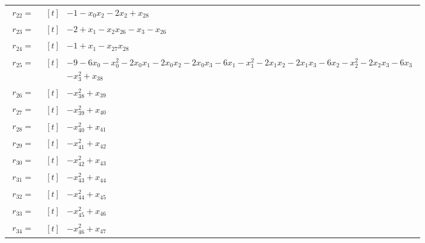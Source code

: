 \begin{longtable}{@{}r p{0.92\linewidth}@{}}
$r_{22}=$ & $\begin{aligned}[t]&-1-x_{0}x_{2}-2x_{2}+x_{28}\end{aligned}$ \\[2pt]
$r_{23}=$ & $\begin{aligned}[t]&-2+x_{1}-x_{2}x_{26}-x_{3}-x_{26}\end{aligned}$ \\[2pt]
$r_{24}=$ & $\begin{aligned}[t]&-1+x_{1}-x_{27}x_{28}\end{aligned}$ \\[2pt]
$r_{25}=$ & $\begin{aligned}[t]&-9-6x_{0}-x_{0}^{2}-2x_{0}x_{1}-2x_{0}x_{2}-2x_{0}x_{3}-6x_{1}-x_{1}^{2}-2x_{1}x_{2}-2x_{1}x_{3}-6x_{2}-x_{2}^{2}-2x_{2}x_{3}-6x_{3}\\[-1pt] &-x_{3}^{2}+x_{38}\end{aligned}$ \\[2pt]
$r_{26}=$ & $\begin{aligned}[t]&-x_{38}^{2}+x_{39}\end{aligned}$ \\[2pt]
$r_{27}=$ & $\begin{aligned}[t]&-x_{39}^{2}+x_{40}\end{aligned}$ \\[2pt]
$r_{28}=$ & $\begin{aligned}[t]&-x_{40}^{2}+x_{41}\end{aligned}$ \\[2pt]
$r_{29}=$ & $\begin{aligned}[t]&-x_{41}^{2}+x_{42}\end{aligned}$ \\[2pt]
$r_{30}=$ & $\begin{aligned}[t]&-x_{42}^{2}+x_{43}\end{aligned}$ \\[2pt]
$r_{31}=$ & $\begin{aligned}[t]&-x_{43}^{2}+x_{44}\end{aligned}$ \\[2pt]
$r_{32}=$ & $\begin{aligned}[t]&-x_{44}^{2}+x_{45}\end{aligned}$ \\[2pt]
$r_{33}=$ & $\begin{aligned}[t]&-x_{45}^{2}+x_{46}\end{aligned}$ \\[2pt]
$r_{34}=$ & $\begin{aligned}[t]&-x_{46}^{2}+x_{47}\end{aligned}$ \\[2pt]

\end{longtable}
